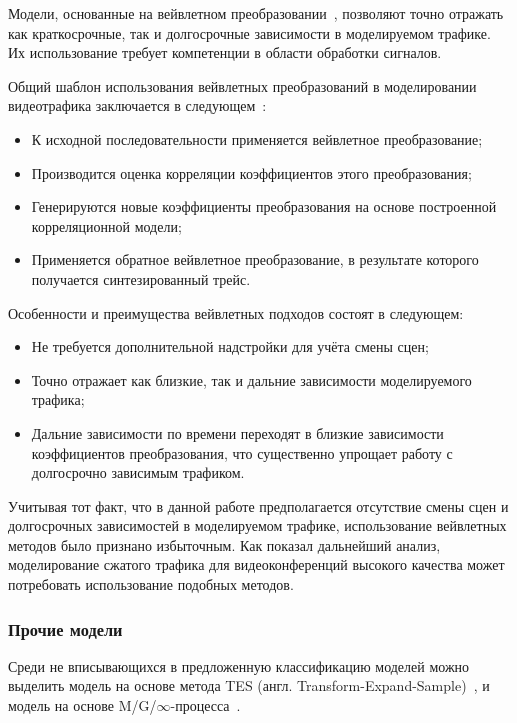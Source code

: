 Модели, основанные на вейвлетном преобразовании~\cite{salomoncomp},
позволяют точно отражать как краткосрочные, так и долгосрочные зависимости
в моделируемом трафике. Их использование требует компетенции в области
обработки сигналов.

Общий шаблон использования вейвлетных преобразований в моделировании
видеотрафика заключается в следующем~\cite{survey2013, wavelet}:

\begin{itemize}
    \item К исходной последовательности применяется вейвлетное преобразование;
    \item Производится оценка корреляции коэффициентов этого преобразования;
    \item Генерируются новые коэффициенты преобразования на основе построенной корреляционной модели;
    \item Применяется обратное вейвлетное преобразование, в результате которого получается синтезированный трейс.
\end{itemize}
\hspace{2pt}

Особенности и преимущества вейвлетных подходов состоят в следующем:
\begin{itemize}
    \item Не требуется дополнительной надстройки для учёта смены сцен;
    \item Точно отражает как близкие, так и дальние зависимости моделируемого трафика;
    \item Дальние зависимости по времени переходят в близкие
        зависимости коэффициентов преобразования, что существенно
        упрощает работу с долгосрочно зависимым трафиком.
\end{itemize}
\hspace{2pt}

Учитывая тот факт, что в данной работе предполагается отсутствие
смены сцен и долгосрочных зависимостей в моделируемом трафике,
использование вейвлетных методов было признано избыточным.
Как показал дальнейший анализ, моделирование сжатого трафика
для видеоконференций высокого качества может потребовать использование
подобных методов.

\subsubsection{Прочие модели}
\hspace{3pt}

Среди не вписывающихся в предложенную классификацию моделей
можно выделить модель на основе метода TES (англ. Transform-Expand-Sample)~\cite{tesmodel},
и модель на основе M/G/$\infty$-процесса~\cite{mginfty}.

